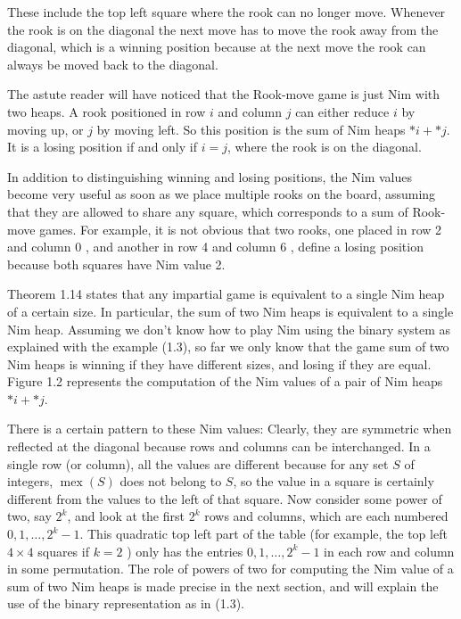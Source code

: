 \documentclass[12pt]{article}
\begin{document}
These include the top left square where the rook can no longer move. Whenever the rook is on the diagonal the next move has to move the rook away from the diagonal, which is a winning position because at the next move the rook can always be moved back to the diagonal.

The astute reader will have noticed that the Rook-move game is just Nim with two heaps. A rook positioned in row $i$ and column $j$ can either reduce $i$ by moving up, or $j$ by moving left. So this position is the sum of Nim heaps $* i+* j$. It is a losing position if and only if $i=j$, where the rook is on the diagonal.

In addition to distinguishing winning and losing positions, the Nim values become very useful as soon as we place multiple rooks on the board, assuming that they are allowed to share any square, which corresponds to a sum of Rook-move games. For example, it is not obvious that two rooks, one placed in row 2 and column 0 , and another in row 4 and column 6 , define a losing position because both squares have Nim value 2.

Theorem 1.14 states that any impartial game is equivalent to a single Nim heap of a certain size. In particular, the sum of two Nim heaps is equivalent to a single Nim heap. Assuming we don't know how to play Nim using the binary system as explained with the example (1.3), so far we only know that the game sum of two Nim heaps is winning if they have different sizes, and losing if they are equal. Figure 1.2 represents the computation of the Nim values of a pair of Nim heaps $* i+* j$.

There is a certain pattern to these Nim values: Clearly, they are symmetric when reflected at the diagonal because rows and columns can be interchanged. In a single row (or column), all the values are different because for any set $S$ of integers, $\operatorname{mex}(S)$ does not belong to $S$, so the value in a square is certainly different from the values to the left of that square. Now consider some power of two, say $2^{k}$, and look at the first $2^{k}$ rows and columns, which are each numbered $0,1, \ldots, 2^{k}-1$. This quadratic top left part of the table (for example, the top left $4 \times 4$ squares if $k=2$ ) only has the entries $0,1, \ldots, 2^{k}-1$ in each row and column in some permutation. The role of powers of two for computing the Nim value of a sum of two Nim heaps is made precise in the next section, and will explain the use of the binary representation as in (1.3).
\end{document}
